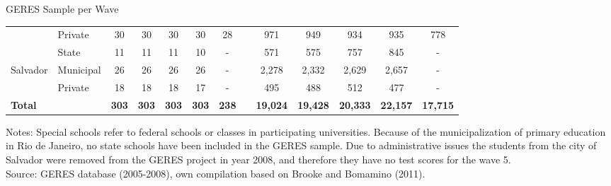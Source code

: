 \documentclass{beamer}
\begin{document}
\begin{frame}[label=SampleWave]{GERES Sample per Wave}
\begin{table}[H]
\begin{adjustbox}{max width=\textwidth}
\begin{tabular}{llllllllllllr}
          & Private & \multicolumn{1}{c}{30 } & \multicolumn{1}{c}{30 } & \multicolumn{1}{c}{30 } & \multicolumn{1}{c}{30 } & \multicolumn{1}{c}{28 } &       & \multicolumn{1}{c}{971 } & \multicolumn{1}{c}{949} & \multicolumn{1}{c}{934 } & \multicolumn{1}{c}{935 } & \multicolumn{1}{c}{778 } \\
\cmidrule{1-7}\cmidrule{9-13}          & State & \multicolumn{1}{c}{11 } & \multicolumn{1}{c}{11 } & \multicolumn{1}{c}{11 } & \multicolumn{1}{c}{10 } & \multicolumn{1}{c}{-} &       & \multicolumn{1}{c}{571 } & \multicolumn{1}{c}{575} & \multicolumn{1}{c}{757 } & \multicolumn{1}{c}{845 } & \multicolumn{1}{c}{-} \\
    Salvador & Municipal & \multicolumn{1}{c}{26 } & \multicolumn{1}{c}{26 } & \multicolumn{1}{c}{26 } & \multicolumn{1}{c}{26 } & \multicolumn{1}{c}{-} &       & \multicolumn{1}{c}{2,278 } & \multicolumn{1}{c}{2,332} & \multicolumn{1}{c}{2,629 } & \multicolumn{1}{c}{2,657 } & \multicolumn{1}{c}{-} \\
          & Private & \multicolumn{1}{c}{18 } & \multicolumn{1}{c}{18 } & \multicolumn{1}{c}{18 } & \multicolumn{1}{c}{17 } & \multicolumn{1}{c}{-} &       & \multicolumn{1}{c}{495 } & \multicolumn{1}{c}{488} & \multicolumn{1}{c}{512 } & \multicolumn{1}{c}{477 } & \multicolumn{1}{c}{-} \\
    \midrule
    \textbf{Total} &       & \multicolumn{1}{c}{\textbf{303 }} & \multicolumn{1}{c}{\textbf{303 }} & \multicolumn{1}{c}{\textbf{303 }} & \multicolumn{1}{c}{\textbf{303 }} & \multicolumn{1}{c}{\textbf{238 }} &       & \multicolumn{1}{c}{\textbf{19,024 }} & \multicolumn{1}{c}{\textbf{19,428 }} & \multicolumn{1}{c}{\textbf{20,333 }} & \multicolumn{1}{c}{\textbf{22,157 }} & \multicolumn{1}{c}{\textbf{17,715 }} \\
    \bottomrule
    \end{tabular}%
\end{adjustbox}

    \begin{minipage}{1\textwidth} 
{\tiny
Notes: Special schools refer to federal schools or classes in participating universities. Because of the municipalization of primary education in Rio de Janeiro, no state schools have been included in the GERES sample. Due to administrative issues the students from the city of Salvador were removed from the GERES project in year 2008, and therefore they have no test scores for the wave 5. \\ Source: GERES database (2005-2008), own compilation based on Brooke and Bomamino (2011).\par}
\end{minipage}
\end{table}%
\vspace{10pt}
\end{frame}
\end{document}
